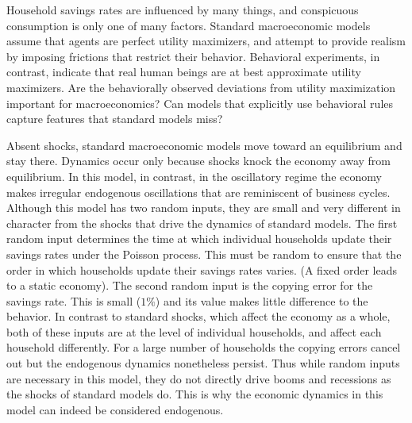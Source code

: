 Household savings rates are influenced by many things, and conspicuous consumption is only one of many factors. Standard macroeconomic models assume that agents are perfect utility maximizers, and attempt to provide realism by imposing frictions that restrict their behavior. Behavioral experiments, in contrast, indicate that real human beings are at best approximate utility maximizers.  Are the behaviorally observed deviations from utility maximization important for macroeconomics?  Can models that explicitly use behavioral rules capture features that standard models miss?

Absent shocks, standard macroeconomic models move toward an equilibrium and stay there.   Dynamics occur only because shocks knock the economy away from equilibrium. In this model, in contrast, in the oscillatory regime the economy makes irregular endogenous oscillations that are reminiscent of business cycles.  
Although this model has two random inputs, they are small and very different in character from the shocks that drive the dynamics of standard models. The first random input determines the time at which individual households update their savings rates under the Poisson process.  This must be random to ensure that the order in which households update their savings rates varies.  (A fixed order leads to a static economy).  The second random input is the copying error for the savings rate.  This is small ($1\%$) and its value makes little difference to the behavior.  In contrast to standard shocks, which affect the economy as a whole, both of these inputs are at the level of individual households, and affect each household differently.  For a large number of households the copying errors cancel out but the endogenous dynamics nonetheless persist.  Thus while random inputs are necessary in this model, they do not directly drive booms and recessions as the shocks of standard models do.  This is why the economic dynamics in this model can indeed be considered endogenous.


